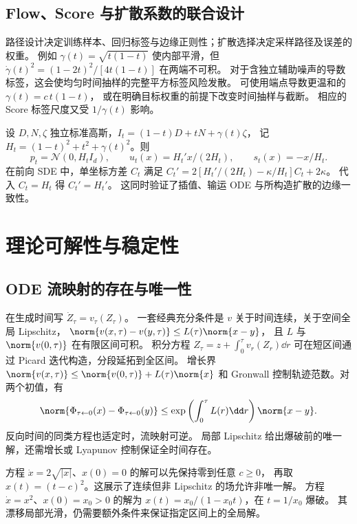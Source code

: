 \subsection{Flow、Score 与扩散系数的联合设计}

路径设计决定训练样本、回归标签与边缘正则性；扩散选择决定采样路径及误差的权重。
例如 \(\gamma(t)=\sqrt{t(1-t)}\) 使内部平滑，但
\(\dot\gamma(t)^2=(1-2t)^2/[4t(1-t)]\) 在两端不可积。
对于含独立辅助噪声的导数标签，这会使均匀时间抽样的完整平方标签风险发散。
可使用端点导数更温和的 \(\gamma(t)=c\,t(1-t)\)，
或在明确目标权重的前提下改变时间抽样与截断。
相应的 Score 标签尺度又受 \(1/\gamma(t)\) 影响。

\begin{example}[三种场共用一条高斯路径]
设 \(D,N,\zeta\) 独立标准高斯，\(I_t=(1-t)D+tN+\gamma(t)\zeta\)，
记 \(H_t=(1-t)^2+t^2+\gamma(t)^2\)。则
\[
 p_t=\mathcal N(0,H_tI_d),\qquad
 u_t(x)=H_t'x/(2H_t),\qquad s_t(x)=-x/H_t.
\]
在前向 SDE 中，单坐标方差 \(C_t\) 满足
\(C_t'=2[H_t'/(2H_t)-\kappa/H_t]C_t+2\kappa\)。
代入 \(C_t=H_t\) 得 \(C_t'=H_t'\)。
这同时验证了插值、输运 ODE 与所构造扩散的边缘一致性。
\end{example}

\section{理论可解性与稳定性}
\label{sec:unified-wellposedness}

\subsection{ODE 流映射的存在与唯一性}

在生成时间写 \(\dot Z_\tau=v_\tau(Z_\tau)\)。
一套经典充分条件是 \(v\) 关于时间连续，关于空间全局 Lipschitz，
\(\norm{v(x,\tau)-v(y,\tau)}\le L(\tau)\norm{x-y}\)，
且 \(L\) 与 \(\norm{v(0,\tau)}\) 在有限区间可积。
积分方程 \(Z_\tau=z+\int_0^\tau v_r(Z_r)\dd r\)
可在短区间通过 Picard 迭代构造，分段延拓到全区间。
增长界 \(\norm{v(x,\tau)}\le\norm{v(0,\tau)}+L(\tau)\norm{x}\)
和 Gronwall 控制轨迹范数。对两个初值，有
\begin{equation}
 \norm{\Phi_{\tau\leftarrow0}(x)-\Phi_{\tau\leftarrow0}(y)}
 \le\exp\left(\int_0^\tau L(r)\dd r\right)\norm{x-y}.
 \label{eq:unified-flow-stability}
\end{equation}
反向时间的同类方程也适定时，流映射可逆。
局部 Lipschitz 给出爆破前的唯一解，还需增长或 Lyapunov 控制保证全时间存在。

\begin{example}[唯一性与爆破各自需要条件]
方程 \(\dot x=2\sqrt{|x|}\)、\(x(0)=0\) 的解可以先保持零到任意 \(c\ge0\)，
再取 \(x(t)=(t-c)^2\)。这展示了连续但非 Lipschitz 的场允许非唯一解。
方程 \(\dot x=x^2\)、\(x(0)=x_0>0\) 的解为
\(x(t)=x_0/(1-x_0t)\)，在 \(t=1/x_0\) 爆破。
其漂移局部光滑，仍需要额外条件来保证指定区间上的全局解。
\end{example}

